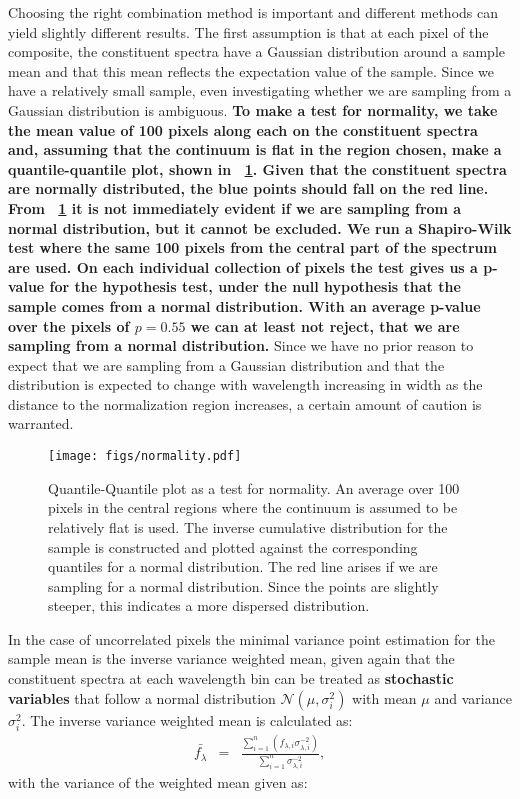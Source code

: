 \documentclass{aa}    %
\newcommand{\figref}[1]{\ref{fig:#1}}
\newcommand{\Fig}[1]{\figurename~\figref{#1}}
\newcommand{\fig}[1]{\Fig{#1}}
\newcommand{\figlabel}[1]{\label{fig:#1}}
\newcommand{\eqlabel}[1]{\label{eq:#1}}
\begin{document}
Choosing the right combination method is important and different
methods can yield slightly different results. The first assumption is
that at each pixel of the composite, the constituent spectra have a Gaussian
distribution around a sample mean and that this mean reflects the
expectation value of the sample. Since we have a relatively small
sample, even investigating whether we are sampling from a Gaussian
distribution is ambiguous. \textbf{To make a test for normality, we take the
mean value of 100 pixels along each on the constituent spectra and, assuming that the continuum is
flat in the region chosen, make a \textbf{quantile-quantile plot, shown in \Fig{normality}.} Given that the constituent spectra are normally distributed, the blue points should
fall on the red line. From
\fig{normality} it is not immediately evident if we are sampling from
a normal distribution, but it cannot be excluded. We run a
Shapiro-Wilk test where the same 100 pixels from the central part of
the spectrum are used. On each individual collection of pixels the test
gives us a p-value for the hypothesis test,
under the null hypothesis that the sample comes from a normal
distribution. With an average p-value over the pixels of $p = 0.55$ we can at
least not reject, that we are sampling from a normal
distribution.} Since we have no prior reason to expect that we are
sampling from a Gaussian distribution and that the distribution is
expected to change with wavelength increasing in width as the distance
to the normalization region increases, a certain amount of caution is
warranted.

\begin{figure}[t!]
  \centering
  \texttt{[image: figs/normality.pdf]}
  \caption[]{Quantile-Quantile plot as a test for normality. An average over 100
pixels in the central regions where the continuum is assumed to be relatively
flat is used. The inverse cumulative distribution for the sample is constructed
and plotted against the corresponding quantiles for a normal distribution. The
red line arises if we are sampling for a normal distribution. Since the points
are slightly steeper, this indicates a more dispersed distribution.}
 \figlabel{normality}
\end{figure}

In the case of uncorrelated pixels the minimal variance point estimation for the
sample mean is the inverse variance weighted mean, given again that the
constituent spectra at each wavelength bin can be treated as \textbf{stochastic
variables} that follow a normal distribution $\mathcal{N}(\mu, \sigma_i^2)$ with
mean $\mu$ and variance $\sigma_i^2$. The inverse variance weighted mean is
calculated as:
\begin{eqnarray} \eqlabel{wmean}
\bar{f_{\lambda}} &=& \frac{ \sum_{i=1}^n \left( f_{\lambda, i} \sigma_{\lambda,
i}^{-2} \right)}{\sum_{i=1}^n \sigma_{\lambda, i}^{-2}},
\end{eqnarray}
with the variance of the weighted mean given as: 
\end{document}
